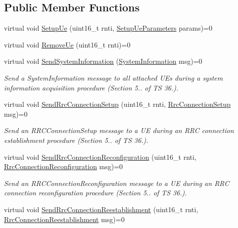 \subsection*{Public Member Functions}
\begin{DoxyCompactItemize}
\item 
virtual void \hyperlink{classns3_1_1LteEnbRrcSapUser_a4b99011d412999337fdc84f8f3876870}{Setup\+Ue} (uint16\+\_\+t rnti, \hyperlink{structns3_1_1LteEnbRrcSapUser_1_1SetupUeParameters}{Setup\+Ue\+Parameters} params)=0
\item 
virtual void \hyperlink{classns3_1_1LteEnbRrcSapUser_a76263311788b07b9bb3f76e15c9d9a96}{Remove\+Ue} (uint16\+\_\+t rnti)=0
\item 
virtual void \hyperlink{classns3_1_1LteEnbRrcSapUser_a782ee98104b3d876b498dfd65214e707}{Send\+System\+Information} (\hyperlink{structns3_1_1LteRrcSap_1_1SystemInformation}{System\+Information} msg)=0
\begin{DoxyCompactList}\small\item\em Send a {\itshape System\+Information} message to all attached U\+Es during a system information acquisition procedure (Section 5.. of TS 36.). \end{DoxyCompactList}\item 
virtual void \hyperlink{classns3_1_1LteEnbRrcSapUser_a25c4eb88452a72e19d59fa7eb611a403}{Send\+Rrc\+Connection\+Setup} (uint16\+\_\+t rnti, \hyperlink{structns3_1_1LteRrcSap_1_1RrcConnectionSetup}{Rrc\+Connection\+Setup} msg)=0
\begin{DoxyCompactList}\small\item\em Send an {\itshape R\+R\+C\+Connection\+Setup} message to a UE during an R\+RC connection establishment procedure (Section 5.. of TS 36.). \end{DoxyCompactList}\item 
virtual void \hyperlink{classns3_1_1LteEnbRrcSapUser_aba0154067bad8a9ba2bdc23cfb6ada62}{Send\+Rrc\+Connection\+Reconfiguration} (uint16\+\_\+t rnti, \hyperlink{structns3_1_1LteRrcSap_1_1RrcConnectionReconfiguration}{Rrc\+Connection\+Reconfiguration} msg)=0
\begin{DoxyCompactList}\small\item\em Send an {\itshape R\+R\+C\+Connection\+Reconfiguration} message to a UE during an R\+RC connection reconfiguration procedure (Section 5.. of TS 36.). \end{DoxyCompactList}\item 
virtual void \hyperlink{classns3_1_1LteEnbRrcSapUser_a1e473b63815bd09f943b9587952e93c5}{Send\+Rrc\+Connection\+Reestablishment} (uint16\+\_\+t rnti, \hyperlink{structns3_1_1LteRrcSap_1_1RrcConnectionReestablishment}{Rrc\+Connection\+Reestablishment} msg)=0

\end{DoxyCompactItemize}
